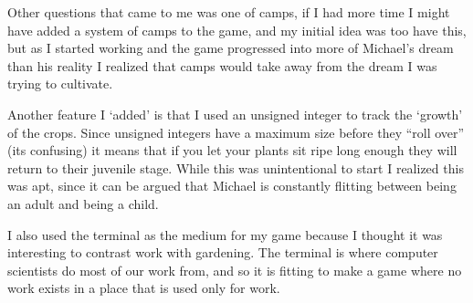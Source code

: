 \documentclass{article}
\begin{document}
Other questions that came to me was one of camps, if I had more time I might have added a system of camps to the game, and my initial idea was too have this, but as I started working and the game progressed into more of Michael's dream than his reality I realized that camps would take away from the dream I was trying to cultivate. 

Another feature I `added' is that I used an unsigned integer to track the `growth' of the crops. Since unsigned integers have a maximum size before they ``roll over'' (its confusing) it means that if you let your plants sit ripe long enough they will return to their juvenile stage. While this was unintentional to start I realized this was apt, since it can be argued that Michael is constantly flitting between being an adult and being a child.

I also used the terminal as the medium for my game because I thought it was interesting to contrast work with gardening. The terminal is where computer scientists do most of our work from, and so it is fitting to make a game where no work exists in a place that is used only for work. 
\end{document}
